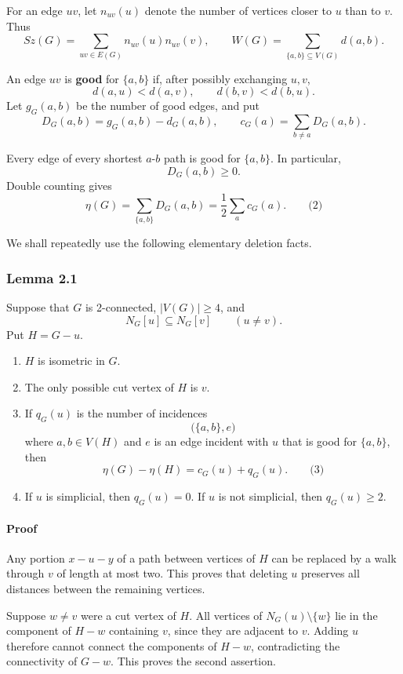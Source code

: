 \documentclass[
  11pt,
  a4paper,
]{article}
\providecommand{\tightlist}{%
  \setlength{\itemsep}{0pt}\setlength{\parskip}{0pt}}
\begin{document}
For an edge \(uv\), let \(n_{uv}(u)\) denote the number of vertices
closer to \(u\) than to \(v\). Thus \[
Sz(G)=\sum_{uv\in E(G)}n_{uv}(u)n_{uv}(v),
\qquad
W(G)=\sum_{\{a,b\}\subseteq V(G)}d(a,b).
\]

An edge \(uv\) is \textbf{good} for \(\{a,b\}\) if, after possibly
exchanging \(u,v\), \[
d(a,u)<d(a,v),
\qquad
d(b,v)<d(b,u).
\] Let \(g_G(a,b)\) be the number of good edges, and put \[
D_G(a,b)=g_G(a,b)-d_G(a,b),
\qquad
c_G(a)=\sum_{b\ne a}D_G(a,b).
\]

Every edge of every shortest \(a\)-\(b\) path is good for \(\{a,b\}\).
In particular, \[
D_G(a,b)\ge0.
\] Double counting gives \[
\boxed{\eta(G)=\sum_{\{a,b\}}D_G(a,b)
              =\frac12\sum_a c_G(a).}
\qquad\text{(2)}
\]

We shall repeatedly use the following elementary deletion facts.

\subsubsection{Lemma 2.1}\label{lemma-2.1}

Suppose that \(G\) is 2-connected, \(|V(G)|\ge4\), and \[
N_G[u]\subseteq N_G[v]
\qquad (u\ne v).
\] Put \(H=G-u\).

\begin{enumerate}
\def\labelenumi{\arabic{enumi}.}
\tightlist
\item
  \(H\) is isometric in \(G\).
\item
  The only possible cut vertex of \(H\) is \(v\).
\item
  If \(q_G(u)\) is the number of incidences \[
  \bigl(\{a,b\},e\bigr)
  \] where \(a,b\in V(H)\) and \(e\) is an edge incident with \(u\) that
  is good for \(\{a,b\}\), then \[
  \eta(G)-\eta(H)=c_G(u)+q_G(u).
  \qquad\text{(3)}
  \]
\item
  If \(u\) is simplicial, then \(q_G(u)=0\). If \(u\) is not simplicial,
  then \(q_G(u)\ge2\).
\end{enumerate}

\paragraph{Proof}\label{proof}

Any portion \(x-u-y\) of a path between vertices of \(H\) can be
replaced by a walk through \(v\) of length at most two. This proves that
deleting \(u\) preserves all distances between the remaining vertices.

Suppose \(w\ne v\) were a cut vertex of \(H\). All vertices of
\(N_G(u)\setminus\{w\}\) lie in the component of \(H-w\) containing
\(v\), since they are adjacent to \(v\). Adding \(u\) therefore cannot
connect the components of \(H-w\), contradicting the connectivity of
\(G-w\). This proves the second assertion.
\end{document}
